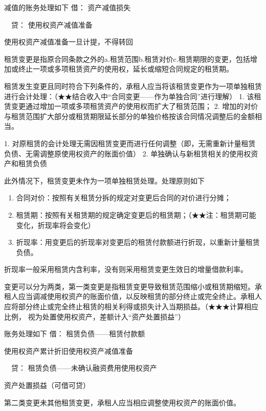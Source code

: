 \documentclass[UTF8,12pt]{ctexart}
\newenvironment{Dr}{\noindent 借：}{\par}
\newenvironment{Cr}{\noindent \ \ 贷：}{\par}
\numberwithin{equation}{section} %
\numberwithin{figure}{section}
\numberwithin{table}{section}
\begin{document}
	减值的账务处理如下
	\begin{Dr}
		资产减值损失
	\end{Dr}
	\begin{Cr}
		使用权资产减值准备
	\end{Cr}
	使用权资产减值准备一旦计提，不得转回
	
	租赁变更是指原合同条款之外的a.租赁范围b.租赁对价c.租赁期限的变更，包括增加或终止一项或多项租赁资产的使用权，延长或缩短合同规定的租赁期。
	
	租赁发生变更且同时符合下列条件的，承租人应当将该租赁变更作为一项单独租赁进行会计处理：（★★结合收入中“合同变更——作为单独合同”进行理解）
	1.	该租赁变更通过增加一项或多项租赁资产的使用权而扩大了租赁范围；
	2.	增加的对价与租赁范围扩大部分或租赁期限延长部分的单独价格按该合同情况调整后的金额相当。
	
	1.	对原租赁的会计处理无需因租赁变更而进行任何调整（即，无需重新计量租赁负债、无需调整原使用权资产的账面价值）
	2.	单独确认与新租赁相关的使用权资产和租赁负债
	
	此外情况下，租赁变更未作为一项单独租赁处理。处理原则如下
	\begin{enumerate}
		\item 合同对价：按照有关租赁分拆的规定对变更后合同的对价进行分摊；
		
		\item 租赁期：按照有关租赁期的规定确定变更后的租赁期；（★★注：租赁期可能变化，折现率将会变化）
		
		\item 折现率：用变更后的折现率对变更后的租赁付款额进行折现，以重新计量租赁负债。
	\end{enumerate}
	折现率一般采用租赁内含利率，没有则采用租赁变更生效日的增量借款利率。
	
	变更可以分为两类，第一类变更是指租赁变更导致租赁范围缩小或租赁期缩短。承租人应当调减使用权资产的账面价值，以反映租赁的部分终止或完全终止。承租人应将部分终止或完全终止租赁的相关利得或损失计入当期损益。（★★★计算相应比例， 视为处置使用权资产，差额计入“资产处置损益”）
	
	账务处理如下
	\begin{Dr}
		租赁负债——租赁付款额
		
		使用权资产累计折旧使用权资产减值准备
	\end{Dr}
	\begin{Cr}
		租赁负债——未确认融资费用使用权资产
		
		资产处置损益（可借可贷）
	\end{Cr}
	
	第二类变更未其他租赁变更，承租人应当相应调整使用权资产的账面价值。
	
\end{document}
